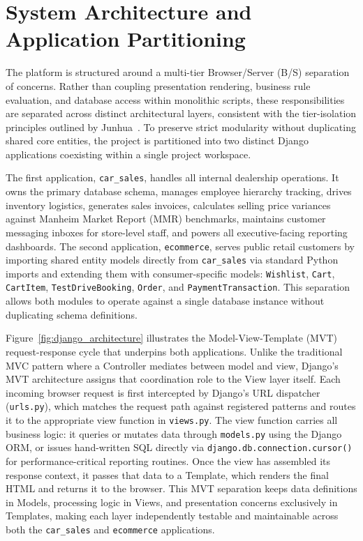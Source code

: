 \section{System Architecture and Application Partitioning}

The platform is structured around a multi-tier Browser/Server (B/S) separation of concerns. Rather than coupling presentation rendering, business rule evaluation, and database access within monolithic scripts, these responsibilities are separated across distinct architectural layers, consistent with the tier-isolation principles outlined by Junhua~\cite{junhua2011design}. To preserve strict modularity without duplicating shared core entities, the project is partitioned into two distinct Django applications coexisting within a single project workspace.

The first application, \texttt{car\_sales}, handles all internal dealership operations. It owns the primary database schema, manages employee hierarchy tracking, drives inventory logistics, generates sales invoices, calculates selling price variances against Manheim Market Report (MMR) benchmarks, maintains customer messaging inboxes for store-level staff, and powers all executive-facing reporting dashboards. The second application, \texttt{ecommerce}, serves public retail customers by importing shared entity models directly from \texttt{car\_sales} via standard Python imports and extending them with consumer-specific models: \texttt{Wishlist}, \texttt{Cart}, \texttt{CartItem}, \texttt{TestDriveBooking}, \texttt{Order}, and \texttt{PaymentTransaction}. This separation allows both modules to operate against a single database instance without duplicating schema definitions.

Figure~\ref{fig:django_architecture} illustrates the Model-View-Template (MVT) request-response cycle that underpins both applications. Unlike the traditional MVC pattern where a Controller mediates between model and view, Django's MVT architecture assigns that coordination role to the View layer itself. Each incoming browser request is first intercepted by Django's URL dispatcher (\texttt{urls.py}), which matches the request path against registered patterns and routes it to the appropriate view function in \texttt{views.py}. The view function carries all business logic: it queries or mutates data through \texttt{models.py} using the Django ORM, or issues hand-written SQL directly via \texttt{django.db.}\allowbreak\texttt{connection.cursor()} for performance-critical reporting routines. Once the view has assembled its response context, it passes that data to a Template, which renders the final HTML and returns it to the browser. This MVT separation keeps data definitions in Models, processing logic in Views, and presentation concerns exclusively in Templates, making each layer independently testable and maintainable across both the \texttt{car\_sales} and \texttt{ecommerce} applications.

